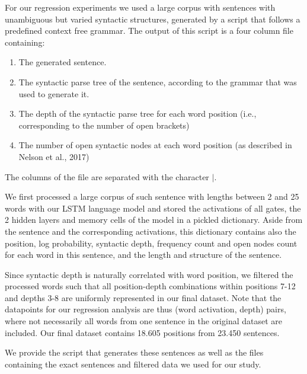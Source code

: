 \documentclass{article}
\begin{document}
For our regression experiments we used a large corpus with sentences with unambiguous but varied syntactic structures, generated by a script that follows a predefined context free grammar.
The output of this script is a four column file containing:\begin{enumerate}
    \item The generated sentence.
    \item The syntactic parse tree of the sentence, according to the grammar that was used to generate it.
    \item The depth of the syntactic parse tree for each word position (i.e., corresponding to the number of open brackets)
    \item The number of open syntactic nodes at each word position (as described in Nelson et al., 2017)
\end{enumerate}

\noindent The columns of the file are separated with the character $|$.

We first processed a large corpus of such sentence with lengths between 2 and 25 words with our LSTM language model and stored the activations of all gates, the 2 hidden layers and memory cells of the model in a pickled dictionary.
Aside from the sentence and the corresponding activations, this dictionary contains also the position, log probability, syntactic depth, frequency count and open nodes count for each word in this sentence, and the length and structure of the sentence.

Since syntactic depth is naturally correlated with word position, we filtered the processed words such that all position-depth combinations within positions 7-12 and depths 3-8 are uniformly represented in our final dataset.
Note that the datapoints for our regression analysis are thus (word activation, depth) pairs, where not necessarily all words from one sentence in the original dataset are included.
Our final dataset contains 18.605 positions from 23.450 sentences.

We provide the script that generates these sentences as well as the files containing the exact sentences and filtered data we used for our study.
\end{document}
